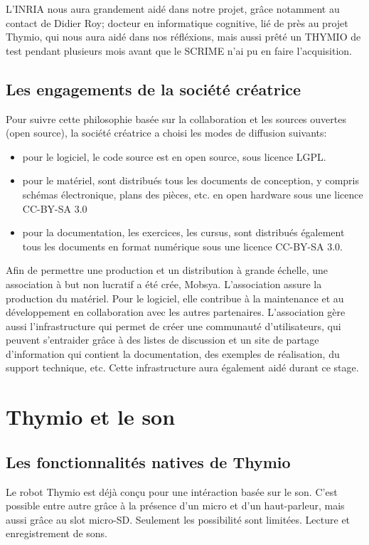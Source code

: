 \documentclass[a4paper, 12pt]{report}
\begin{document}
L'INRIA nous aura grandement aidé dans notre projet, grâce notamment au contact de Didier Roy; docteur en informatique cognitive, lié de près au projet Thymio, qui nous aura aidé dans nos réfléxions, mais aussi prêté un THYMIO de test pendant plusieurs mois avant que le SCRIME n'ai pu en faire l'acquisition.

\section{Les engagements de la société créatrice \cite{thymio2016}}
Pour suivre cette philosophie basée sur la collaboration et les sources ouvertes (open source), la société créatrice a choisi les modes de diffusion suivants:
\begin{itemize}
\item pour le logiciel, le code source est en open source, sous licence LGPL.
\item pour le matériel, sont distribués tous les documents de conception, y compris schémas électronique, plans des pièces, etc. en open hardware sous une licence CC-BY-SA 3.0
\item pour la documentation, les exercices, les cursus, sont distribués également tous les documents en format numérique sous une licence CC-BY-SA 3.0.
\end{itemize}

Afin de permettre une production et un distribution à grande échelle, une association à but non lucratif a été crée, Mobsya. L'association assure la production du matériel. Pour le logiciel, elle contribue à la maintenance et au développement en collaboration avec les autres partenaires. L'association gère aussi l'infrastructure qui permet de créer une communauté d'utilisateurs, qui peuvent s'entraider grâce à des listes de discussion et un site de partage d'information qui contient la documentation, des exemples de réalisation, du support technique, etc. Cette infrastructure aura également aidé durant ce stage.

\chapter{Thymio et le son \cite{thymio2016}}
\section{Les fonctionnalités natives de Thymio}
Le robot Thymio est déjà conçu pour une intéraction basée sur le son. C'est possible entre autre grâce à la présence d'un micro et d'un haut-parleur, mais aussi grâce au slot micro-SD. Seulement les possibilité sont limitées.
Lecture et enregistrement de sons.\\
\end{document}
